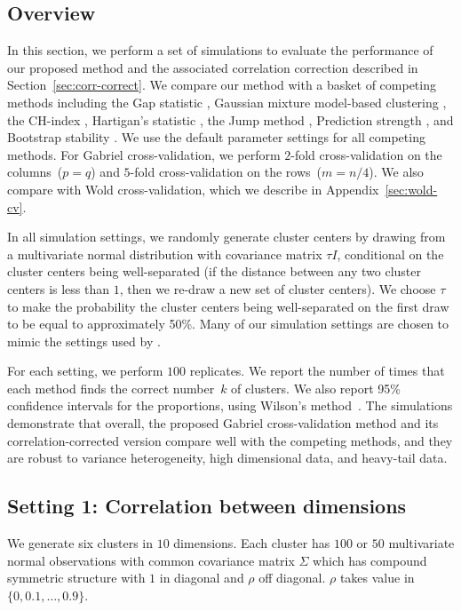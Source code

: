 \documentclass[12pt]{article}
\begin{document}
\subsection{Overview}

In this section, we perform a set of simulations to evaluate the performance of our
proposed method and the associated correlation correction described in
Section~\ref{sec:corr-correct}.
We compare our method
with a basket of competing methods including the Gap statistic
\citep{tibshirani2001estimating}, Gaussian mixture model-based clustering
\citep{fraley2002model}, the CH-index \citep{calinski1974dendrite}, Hartigan's
statistic \citep{hartigan1975clustering}, the Jump method
\citep{sugar2003finding}, Prediction strength \citep{tibshirani2005cluster},
and Bootstrap stability \citep{fang2012selection}.
We use the default parameter settings for all competing methods. For Gabriel
cross-validation, we perform $2$-fold cross-validation on the columns~($p=q$)
and $5$-fold cross-validation on the rows~($m=n/4$).
We also compare with Wold cross-validation, which we describe in
Appendix~\ref{sec:wold-cv}.


In all simulation settings, we randomly generate cluster centers by drawing
from a multivariate normal distribution with covariance matrix $\tau I$,
conditional on the cluster centers being well-separated (if the distance
between any two cluster centers is less than $1$, then we re-draw a new set of
cluster centers). We choose $\tau$ to make the probability the cluster
centers being well-separated on the first draw to be equal to approximately
50\%. Many of our simulation settings are chosen to mimic the settings used by
\cite{tibshirani2001estimating}. 


For each setting, we perform $100$ replicates. We report the number of times
that each method finds the correct number~$k$ of clusters. We also report 95\%
confidence intervals for the proportions, using Wilson's
method~\citep{wilson1927probable}.  The simulations demonstrate that overall,
the proposed Gabriel cross-validation method and its correlation-corrected
version compare well with the competing methods, and they are robust to
variance heterogeneity, high dimensional data, and heavy-tail data.


\subsection{Setting 1: Correlation between dimensions}

We generate six clusters in $10$ dimensions.  Each cluster has $100$ or $50$
multivariate normal observations with common covariance matrix $\Sigma$ which
has compound symmetric structure with $1$ in diagonal and $\rho$ off diagonal.
$\rho$ takes value in $\{0,0.1,...,0.9\}$.
	
\end{document}

